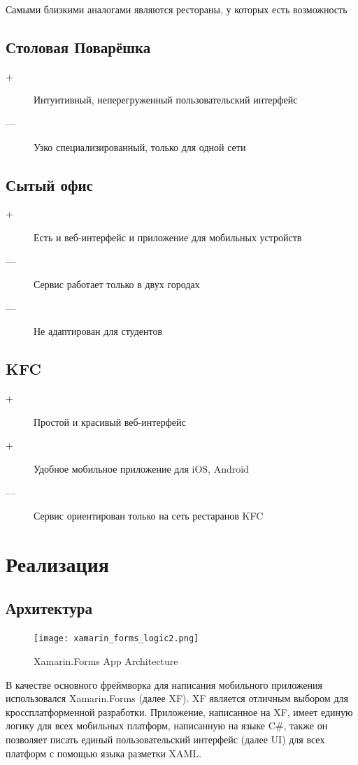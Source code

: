 \documentclass[14pt]{matmex-diploma-custom}
\begin{document}
    Самыми близкими аналогами являются рестораны, у которых есть возможность
    \subsection{Столовая Поварёшка}
    \begin{description}
        \item[+] Интуитивный, неперегруженный пользовательский интерфейс
        \item[—] Узко специализированный, только для одной сети
    \end{description}
	\subsection{Сытый офис}
	\begin{description}
        \item[+] Есть и веб-интерфейс и приложение для мобильных устройств
        \item[—] Сервис работает только в двух городах
        \item[—] Не адаптирован для студентов
    \end{description}
    \subsection{KFC}
	\begin{description}
        \item[+] Простой и красивый веб-интерфейс
        \item[+] Удобное мобильное приложение для iOS, Android
        \item[—] Сервис ориентирован только на сеть рестаранов KFC
    \end{description}

\section{Реализация}
    \subsection{Архитектура}
        \begin{figure}
            \centering
            \texttt{[image: xamarin\_forms\_logic2.png]}
            \caption{Xamarin.Forms App Architecture}
        \end{figure}
        В качестве основного фреймворка для написания мобильного приложения использовался Xamarin.Forms (далее XF).
        XF является отличным выбором для кроссплатформенной разработки.
        Приложение, написанное на XF, имеет единую логику для всех мобильных платформ, написанную на языке C\#, также он позволяет писать единый пользовательский интерфейс (далее UI) для всех платформ с помощью языка разметки XAML.
        
\end{document}
